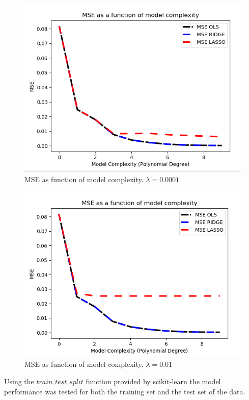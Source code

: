 \documentclass[a4paper,11pt,twocolumn]{article}
\begin{document}
\begin{figure}[h]
\centering
\includegraphics[scale=0.75]{msecomp_lam0001}
\caption{MSE as function of model complexity. $\lambda=0.0001$}
\label{lamlow}
\end{figure}

\begin{figure}[h]
\centering
\includegraphics[scale=0.75]{msecomp_lam01}
\caption{MSE as function of model complexity. $\lambda=0.01$}
\label{lamhigh}
\end{figure}

Using the $train\_test\_split$ function provided by scikit-learn the model performance was tested for both the training set and the test set of the data. 
\end{document}
